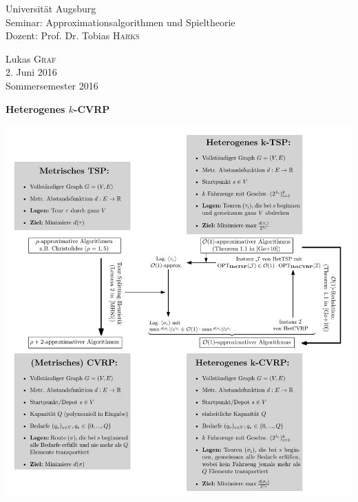 \documentclass[a4paper,ngerman,12pt,bibtotoc]{scrartcl}
\theoremstyle{definition}
\theoremstyle{plain}
\theoremstyle{remark}
\begin{document}
	
	\begin{minipage}{0.7\textwidth}
		\begin{flushleft}
			Universität Augsburg \\
			Seminar: Approximationsalgorithmen und Spieltheorie \\
			Dozent: Prof. Dr. Tobias \textsc{Harks} 
		\end{flushleft}
	\end{minipage}
	\begin{minipage}{0.3\textwidth}
		\begin{flushright}
			Lukas \textsc{Graf} \\
			2. Juni 2016 \\
			Sommersemester 2016
		\end{flushright}
	\end{minipage}
	
	\hrulefill
	\vspace{-1em}
	\begin{center}\LARGE\textbf{Heterogenes $k$-CVRP}\end{center}
	\vspace{-1.4em}
	\hrulefill
	\vspace{-1.4em}
	
	\hrulefill
	
	\vspace{1em}	
	\includegraphics[width=1\textwidth]{Problemdefinitionen2.pdf}
\end{document}
